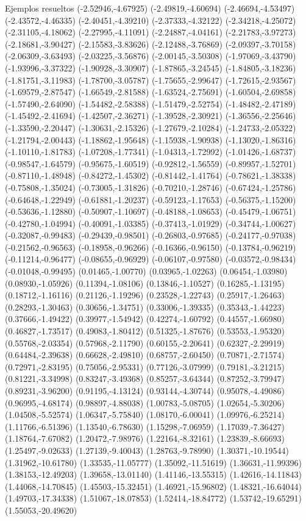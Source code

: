 \documentclass[11pt,a4paper]{article}
\begin{document}
\begin{fmex}{Ejemplos resueltos}
(-2.52946,-4.67925) (-2.49819,-4.60694) (-2.46694,-4.53497) (-2.43572,-4.46335) (-2.40451,-4.39210) (-2.37333,-4.32122) (-2.34218,-4.25072) (-2.31105,-4.18062) (-2.27995,-4.11091) (-2.24887,-4.04161) (-2.21783,-3.97273) (-2.18681,-3.90427) (-2.15583,-3.83626) (-2.12488,-3.76869) (-2.09397,-3.70158) (-2.06309,-3.63493) (-2.03225,-3.56876) (-2.00145,-3.50308) (-1.97069,-3.43790) (-1.93996,-3.37322) (-1.90928,-3.30907) (-1.87865,-3.24545) (-1.84805,-3.18236) (-1.81751,-3.11983) (-1.78700,-3.05787) (-1.75655,-2.99647) (-1.72615,-2.93567) (-1.69579,-2.87547) (-1.66549,-2.81588) (-1.63524,-2.75691) (-1.60504,-2.69858) (-1.57490,-2.64090) (-1.54482,-2.58388) (-1.51479,-2.52754) (-1.48482,-2.47189) (-1.45492,-2.41694) (-1.42507,-2.36271) (-1.39528,-2.30921) (-1.36556,-2.25646) (-1.33590,-2.20447) (-1.30631,-2.15326) (-1.27679,-2.10284) (-1.24733,-2.05322) (-1.21794,-2.00443) (-1.18862,-1.95648) (-1.15938,-1.90938) (-1.13020,-1.86316) (-1.10110,-1.81783) (-1.07208,-1.77341) (-1.04313,-1.72992) (-1.01426,-1.68737) (-0.98547,-1.64579) (-0.95675,-1.60519) (-0.92812,-1.56559) (-0.89957,-1.52701) (-0.87110,-1.48948) (-0.84272,-1.45302) (-0.81442,-1.41764) (-0.78621,-1.38338) (-0.75808,-1.35024) (-0.73005,-1.31826) (-0.70210,-1.28746) (-0.67424,-1.25786) (-0.64648,-1.22949) (-0.61881,-1.20237) (-0.59123,-1.17653) (-0.56375,-1.15200) (-0.53636,-1.12880) (-0.50907,-1.10697) (-0.48188,-1.08653) (-0.45479,-1.06751) (-0.42780,-1.04994) (-0.40091,-1.03385) (-0.37413,-1.01929) (-0.34744,-1.00627) (-0.32087,-0.99483) (-0.29439,-0.98501) (-0.26803,-0.97685) (-0.24177,-0.97038) (-0.21562,-0.96563) (-0.18958,-0.96266) (-0.16366,-0.96150) (-0.13784,-0.96219) (-0.11214,-0.96477) (-0.08655,-0.96929) (-0.06107,-0.97580) (-0.03572,-0.98434) (-0.01048,-0.99495) (0.01465,-1.00770) (0.03965,-1.02263) (0.06454,-1.03980) (0.08930,-1.05926) (0.11394,-1.08106) (0.13846,-1.10527) (0.16285,-1.13195) (0.18712,-1.16116) (0.21126,-1.19296) (0.23528,-1.22743) (0.25917,-1.26463) (0.28293,-1.30463) (0.30656,-1.34751) (0.33006,-1.39335) (0.35343,-1.44223) (0.37666,-1.49422) (0.39977,-1.54942) (0.42274,-1.60792) (0.44557,-1.66980) (0.46827,-1.73517) (0.49083,-1.80412) (0.51325,-1.87676) (0.53553,-1.95320) (0.55768,-2.03354) (0.57968,-2.11790) (0.60155,-2.20641) (0.62327,-2.29919) (0.64484,-2.39638) (0.66628,-2.49810) (0.68757,-2.60450) (0.70871,-2.71574) (0.72971,-2.83195) (0.75056,-2.95331) (0.77126,-3.07999) (0.79181,-3.21215) (0.81221,-3.34998) (0.83247,-3.49368) (0.85257,-3.64344) (0.87252,-3.79947) (0.89231,-3.96200) (0.91195,-4.13124) (0.93144,-4.30744) (0.95078,-4.49086) (0.96995,-4.68174) (0.98897,-4.88038) (1.00783,-5.08705) (1.02654,-5.30206) (1.04508,-5.52574) (1.06347,-5.75840) (1.08170,-6.00041) (1.09976,-6.25214) (1.11766,-6.51396) (1.13540,-6.78630) (1.15298,-7.06959) (1.17039,-7.36427) (1.18764,-7.67082) (1.20472,-7.98976) (1.22164,-8.32161) (1.23839,-8.66693) (1.25497,-9.02633) (1.27139,-9.40043) (1.28763,-9.78990) (1.30371,-10.19544) (1.31962,-10.61780) (1.33535,-11.05777) (1.35092,-11.51619) (1.36631,-11.99396) (1.38153,-12.49203) (1.39658,-13.01140) (1.41146,-13.55315) (1.42616,-14.11843) (1.44068,-14.70845) (1.45503,-15.32451) (1.46921,-15.96802) (1.48321,-16.64044) (1.49703,-17.34338) (1.51067,-18.07853) (1.52414,-18.84772) (1.53742,-19.65291) (1.55053,-20.49620) 
\end{fmex}
\end{document}
